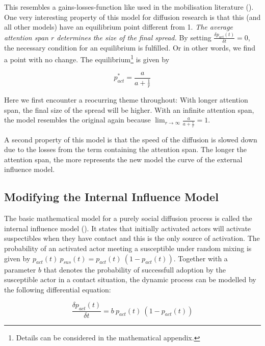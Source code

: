 \documentclass[a4paper,12pt]{article}
\begin{document}
This resembles a gains-losses-function like used in the mobilisation literature (\cite{huckfeldtDynamicModelingIntroduction1982}). One very interesting property of this model for diffusion research is that this (and all other models) have an equilibrium point different from 1. \textit{The average attention span $r$ determines the size of the final spread.} By setting $\frac{\delta p_{act}(t)}{\delta t} = 0$, the necessary condition for an equilibrium is fulfilled. Or in other words, we find a point with no change. The equilibrium\footnote{Details can be considered in the mathematical appendix.} is given by

\begin{equation}
p_{act}^{*} = \frac{a}{a + \frac{1}{r}}
\end{equation} 

Here we first encounter a reocurring theme throughout: With longer attention span, the final size of the spread will be higher. With an infinite attention span, the model resembles the original again because $\lim_{r \to \infty} \frac{a}{a + \frac{1}{r}} = 1$.

A second property of this model is that the speed of the diffusion is slowed down due to the losses from the term containing the attention span. The longer the attention span, the more represents the new model the curve of the external influence model.

\subsection{Modifying the Internal Influence Model}

The basic mathematical model for a purely social diffusion process is called the internal influence model (\cite{mahajanModelsInnovationDiffusion1985}). It states that initially activated actors will activate suspectibles when they have contact and this is the only source of activation. The probability of an activated actor meeting a susceptible under random mixing is given by $p_{act}(t) \ p_{sus}(t) = p_{act}(t) \ (1 - p_{act}(t))$. Together with a parameter $b$ that denotes the probability of successfull adoption by the susceptible actor in a contact situation, the dynamic process can be modelled by the following differential equation:
    
\begin{equation}
\frac{\delta p_{act}(t)}{\delta t} = b \ p_{act}(t) \ (1 - p_{act}(t))
\end{equation}
\end{document}
